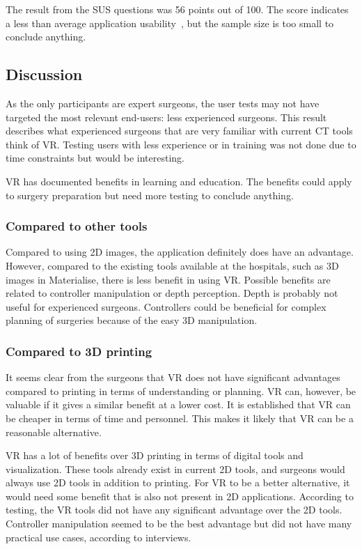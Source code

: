 \documentclass[a4paper]{report}
\begin{document}
The result from the SUS questions was 56 points out of 100. The score indicates a less than average application usability~\cite{system_usability_scale_sus_system_2013}, but the sample size is too small to conclude anything.


\subsection{Discussion}
As the only participants are expert surgeons, the user tests may not have targeted the most relevant end-users: less experienced surgeons. This result describes what experienced surgeons that are very familiar with current CT tools think of VR. Testing users with less experience or in training was not done due to time constraints but would be interesting.

VR has documented benefits in learning and education. The benefits could apply to surgery preparation but need more testing to conclude anything.

\subsubsection{Compared to other tools}

Compared to using 2D images, the application definitely does have an advantage. However, compared to the existing tools available at the hospitals, such as 3D images in Materialise, there is less benefit in using VR.
Possible benefits are related to controller manipulation or depth perception. Depth is probably not useful for experienced surgeons. Controllers could be beneficial for complex planning of surgeries because of the easy 3D manipulation.

\subsubsection{Compared to 3D printing}
It seems clear from the surgeons that VR does not have significant advantages compared to printing in terms of understanding or planning. VR can, however, be valuable if it gives a similar benefit at a lower cost. It is established that VR can be cheaper in terms of time and personnel. This makes it likely that VR can be a reasonable alternative.

VR has a lot of benefits over 3D printing in terms of digital tools and visualization.
These tools already exist in current 2D tools, and surgeons would always use 2D tools in addition to printing.
For VR to be a better alternative, it would need some benefit that is also not present in 2D applications. According to testing, the VR tools did not have any significant advantage over the 2D tools.
Controller manipulation seemed to be the best advantage but did not have many practical use cases, according to interviews.
\end{document}
